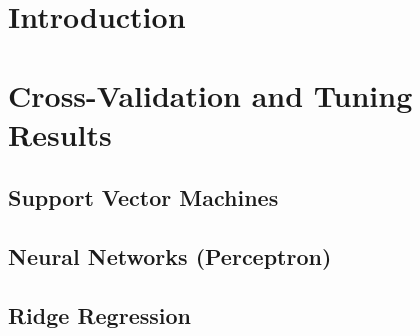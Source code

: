\documentclass[twoside]{scrartcl}
\begin{document}
\section{Introduction}
\section{Cross-Validation and Tuning Results}
\subsection{Support Vector Machines}

\subsection{Neural Networks (Perceptron)}

\subsection{Ridge Regression}

\end{document}

